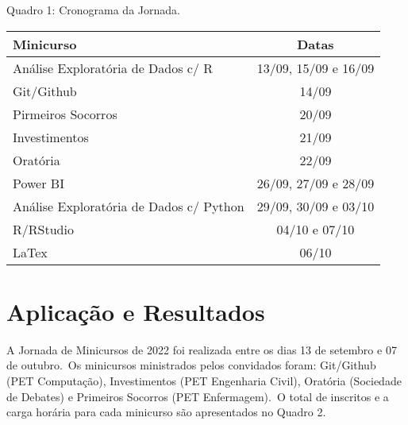\documentclass{sciposter}
\begin{document}
\begin{multicols}{2}
{\begin{center}
    Quadro 1: Cronograma da Jornada.

    \begin{table}[H]
        \centering
        \begin{tabular}{|l|c|}
        \hline
         \textbf{Minicurso} &  \textbf{Datas} \\ \hline
         Análise Exploratória de Dados c/ R  &  13/09, 15/09 e 16/09 \\
         \hline
         Git/Github  &  14/09 \\
         \hline
         Pirmeiros Socorros  &  20/09 \\
         \hline
         Investimentos  &  21/09 \\
         \hline
         Oratória  &  22/09 \\
         \hline
         Power BI  &  26/09, 27/09 e 28/09 \\
         \hline
         Análise Exploratória de Dados c/ Python  &  29/09, 30/09 e 03/10 \\
         \hline
         R/RStudio  &  04/10 e 07/10 \\
         \hline
         LaTex  &  06/10 \\
         \hline
        \end{tabular}
        \label{cronograma}
    \end{table}
\end{center}

\vspace{0.3cm}
\section{Aplicação e Resultados}
A Jornada de Minicursos de 2022 foi realizada entre os dias 13 de setembro e 07 de outubro.\ Os minicursos ministrados pelos convidados foram: Git/Github (PET Computação), Investimentos (PET Engenharia Civil), Oratória (Sociedade de Debates) e Primeiros Socorros (PET Enfermagem).\ O total de inscritos e a carga horária para cada minicurso são apresentados no Quadro 2. 

}
\end{multicols}
\end{document}

